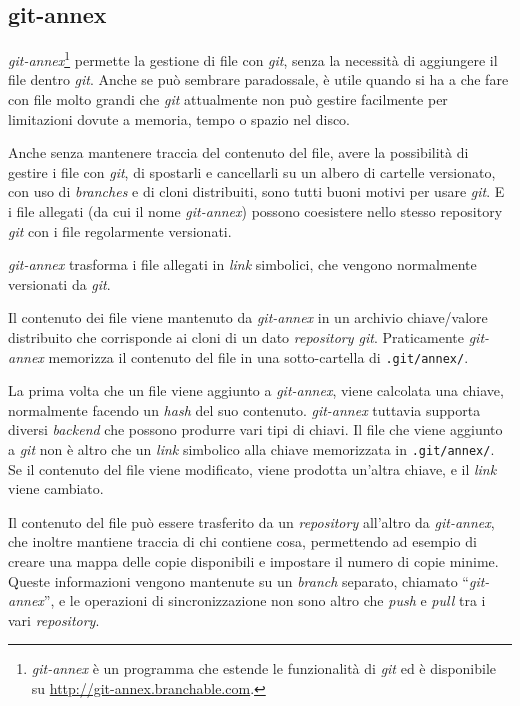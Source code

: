 \subsection{git-annex}
\emph{git-annex}\footnote{\emph{git-annex} è un programma che estende
  le funzionalità di \emph{git} ed è disponibile su
  \url{http://git-annex.branchable.com}.} permette la gestione di file
con \emph{git}, senza la necessità di aggiungere il file dentro
\emph{git}. Anche se può sembrare paradossale, è utile quando si ha a
che fare con file molto grandi che \emph{git} attualmente non può
gestire facilmente per limitazioni dovute a memoria, tempo o spazio
nel disco.

Anche senza mantenere traccia del contenuto del file, avere la 
possibilità di gestire i file con \emph{git}, di spostarli e cancellarli su un
albero di cartelle versionato, con uso di \emph{branches} e di cloni
distribuiti, sono tutti buoni motivi per usare \emph{git}. E i file allegati
(da cui il nome \emph{git-annex}) possono coesistere nello stesso repository
\emph{git} con i file regolarmente versionati.

\emph{git-annex} trasforma i file allegati in \emph{link}
simbolici, che vengono normalmente versionati da \emph{git}. 

Il contenuto dei file viene mantenuto da \emph{git-annex} in un
archivio chiave/valore distribuito che corrisponde ai cloni di un
dato \emph{repository git}. Praticamente \emph{git-annex} memorizza il
contenuto del file in una sotto-cartella di \verb|.git/annex/|.

La prima volta che un file viene aggiunto a \emph{git-annex}, viene
calcolata una chiave, normalmente facendo un \emph{hash} del suo
contenuto. \emph{git-annex} tuttavia supporta diversi \emph{backend}
che possono produrre vari tipi di chiavi. Il file che viene aggiunto a
\emph{git} non è altro che un \emph{link} simbolico alla chiave
memorizzata in \verb|.git/annex/|. Se il contenuto del file viene
modificato, viene prodotta un'altra chiave, e il \emph{link} viene
cambiato.

Il contenuto del file può essere trasferito da un \emph{repository}
all'altro da \emph{git-annex}, che inoltre mantiene traccia di chi
contiene cosa, permettendo ad esempio di creare una mappa delle copie
disponibili e impostare il numero di copie minime. Queste informazioni
vengono mantenute su un \emph{branch} separato, chiamato
``\emph{git-annex}'', e le operazioni di sincronizzazione non sono
altro che \emph{push} e \emph{pull} tra i vari \emph{repository}.

